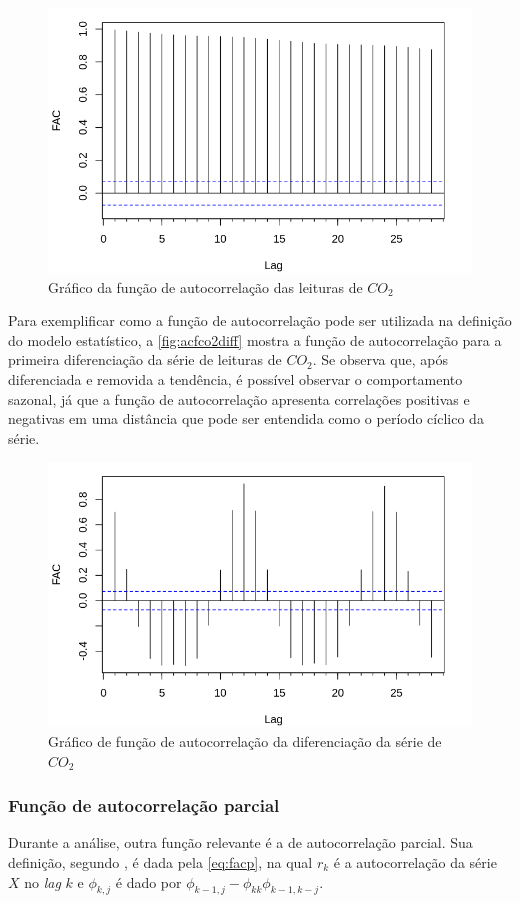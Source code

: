 \documentclass[
    12pt,
    oneside,
    a4paper,
    english,
    brazil
]{abntex2}
\begin{document}
\begin{figure}[ht]
    \centering
    \caption{Gráfico da função de autocorrelação das leituras de
        $CO_2$}\label{fig:correlogramaCo2}
    \includegraphics[width=.5\linewidth]{images/acf_co2.png}
\end{figure}

Para  exemplificar  como a  função  de  autocorrelação  pode ser  utilizada  na
definição do modelo estatístico, a  \autoref{fig:acfco2diff} mostra a função de
autocorrelação para a primeira diferenciação da série de leituras de $CO_2$. Se
observa que,  após diferenciada e removida  a tendência, é possível  observar o
comportamento sazonal, já que a  função de autocorrelação apresenta correlações
positivas e  negativas em uma distância  que pode ser entendida  como o período
cíclico da série.

\begin{figure}[ht]
    \centering
    \caption{Gráfico de função de autocorrelação da diferenciação da série de
        $CO_2$}\label{fig:acfco2diff}
    \includegraphics[width=.5\linewidth]{images/acf_co2_diff.png}
\end{figure}

\subsubsection{Função de autocorrelação parcial}

Durante a  análise, outra função relevante  é a de autocorrelação  parcial. Sua
definição, segundo  , é dada pela  \autoref{eq:facp}, na qual
$r_k$ é a autocorrelação da série $X$ no \textit{lag} $k$ e $\phi_{k,j}$ é dado
por $\phi_{k-1, j}-\phi_{kk}\phi_{k-1,k-j}$.
\end{document}
